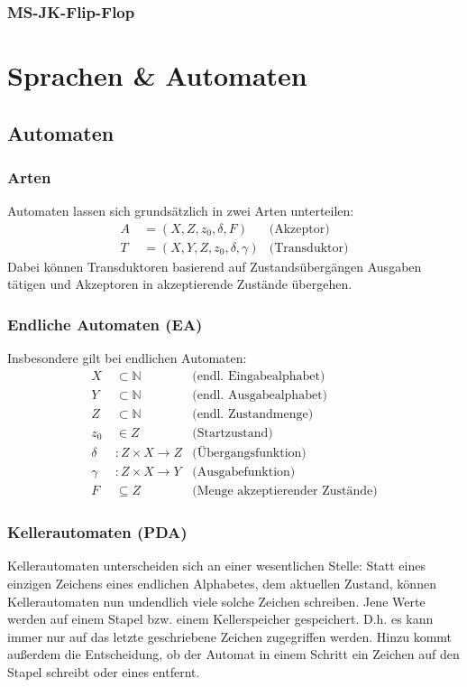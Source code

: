 \documentclass{article}
\begin{document}
\subsubsection{MS-JK-Flip-Flop}
\section{Sprachen \& Automaten}
\subsection{Automaten}
\subsubsection{Arten}
Automaten lassen sich grundsätzlich in zwei Arten unterteilen:
\begin{align}
    A &\:=(X, Z, z_0, \delta, F) &\text{(Akzeptor)}\\
    T &\:=(X, Y, Z, z_0, \delta, \gamma)&\text{(Transduktor)}
\end{align}
Dabei können Transduktoren basierend auf Zustandsübergängen Ausgaben tätigen und Akzeptoren in akzeptierende Zustände übergehen.
\subsubsection {Endliche Automaten (EA)}
Insbesondere gilt bei endlichen Automaten:
\begin{align}
    X &\:\subset \mathbb{N} &\text{(endl. Eingabealphabet)}\\
    Y &\:\subset \mathbb{N} &\text{(endl. Ausgabealphabet)}\\
    Z &\:\subset \mathbb{N} &\text{(endl. Zustandmenge)}\\
    z_0 &\:\in Z &\text{(Startzustand)}\\
    \delta &\:: Z \times X \rightarrow Z &\text{(Übergangsfunktion)}\\
    \gamma &\:: Z \times X \rightarrow Y &\text{(Ausgabefunktion)}\\
    F &\:\subseteq Z &\text{(Menge akzeptierender Zustände)}
\end{align}
\subsubsection{Kellerautomaten (PDA)}
Kellerautomaten unterscheiden sich an einer wesentlichen Stelle: Statt eines einzigen Zeichens eines endlichen Alphabetes, dem aktuellen Zustand, können Kellerautomaten nun undendlich viele solche Zeichen schreiben. Jene Werte werden auf einem Stapel bzw. einem Kellerspeicher gespeichert. D.h. es kann immer nur auf das letzte geschriebene Zeichen zugegriffen werden. Hinzu kommt außerdem die Entscheidung, ob der Automat in einem Schritt ein Zeichen auf den Stapel schreibt oder eines entfernt.
\end{document}
